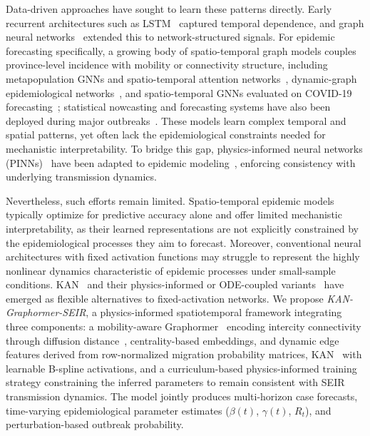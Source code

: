 \documentclass[10pt,letterpaper]{article}
\begin{document}
	Data-driven approaches have sought to learn these patterns directly. Early
	recurrent architectures such as LSTM~\cite{hochreiter1997} captured temporal dependence, and graph neural networks~\cite{wu2020gnn,velickovic2018} extended this to network-structured signals. For epidemic forecasting specifically, a
	growing body of spatio-temporal graph models couples province-level incidence with mobility or connectivity structure, including metapopulation GNNs and spatio-temporal attention networks~\cite{wang2025,gao2021,cao2023,mao2024}, dynamic-graph epidemiological networks~\cite{la2021}, and spatio-temporal GNNs
	evaluated on COVID-19 forecasting~\cite{kapoor2020}; statistical nowcasting and forecasting systems have also been deployed during major outbreaks~\cite{wu2020}. These models learn complex temporal and spatial patterns, yet often lack the epidemiological constraints needed for mechanistic interpretability. To bridge this gap, physics-informed neural networks (PINNs)~\cite{raissi2019} have been adapted to epidemic modeling~\cite{he2023,kharazmi2021}, enforcing consistency with underlying transmission dynamics. 
	
	
	
	Nevertheless, such efforts remain limited. Spatio-temporal epidemic models typically optimize for predictive accuracy alone and offer limited mechanistic interpretability, as their learned representations are not explicitly constrained by the epidemiological processes they aim to forecast. Moreover, conventional neural architectures with
	fixed activation functions may struggle to represent the highly nonlinear
	dynamics characteristic of epidemic processes under small-sample conditions. KAN~\cite{liu2025} and their physics-informed or
	ODE-coupled variants~\cite{koenig2024,guo2025} have emerged as flexible
	alternatives to fixed-activation networks. We propose \textit{KAN-Graphormer-SEIR}, a
	physics-informed spatiotemporal framework integrating three components: a mobility-aware Graphormer~\cite{ying2021} encoding intercity
	connectivity through diffusion distance~\cite{brockmann2013}, centrality-based embeddings, and dynamic edge features derived from row-normalized migration probability matrices, KAN~\cite{liu2025} with learnable B-spline activations, and a curriculum-based physics-informed training strategy constraining the inferred parameters to
	remain consistent with SEIR transmission dynamics. The model jointly produces
	multi-horizon case forecasts, time-varying epidemiological parameter
	estimates ($\beta(t)$, $\gamma(t)$, $R_t$), and perturbation-based outbreak probability.
	
\end{document}
